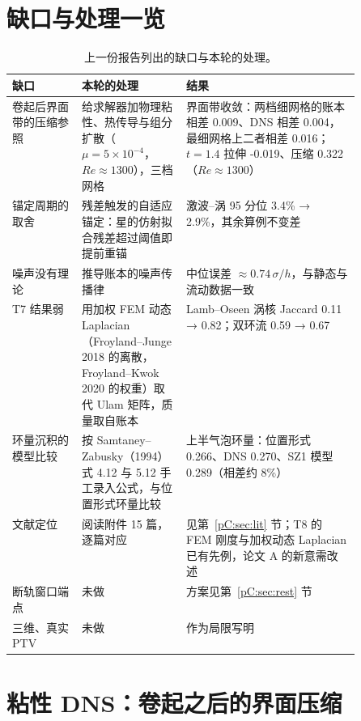 \section{缺口与处理一览}
\begin{table}[!htbp]\centering\small\caption{上一份报告列出的缺口与本轮的处理。}
\begin{tabularx}{\linewidth}{@{}>{\raggedright\arraybackslash}p{0.2\linewidth} >{\raggedright\arraybackslash}p{0.3\linewidth} L@{}}\toprule
缺口 & 本轮的处理 & 结果\\\midrule
卷起后界面带的压缩参照 & 给求解器加物理粘性、热传导与组分扩散（$\mu=5\times10^{-4}$，$Re\approx1300$），三档网格 & 界面带收敛：两档细网格的账本相差 0.009、DNS 相差 0.004，最细网格上二者相差 0.016；$t=1.4$ 拉伸 -0.019、压缩 0.322（$Re\approx1300$）\\
锚定周期的取舍 & 残差触发的自适应锚定：星的仿射拟合残差超过阈值即提前重锚 & 激波–涡 95 分位 3.4\% → 2.9\%，其余算例不变差\\
噪声没有理论 & 推导账本的噪声传播律 & 中位误差 $\approx0.74\,\sigma/h$，与静态与流动数据一致\\
T7 结果弱 & 用加权 FEM 动态 Laplacian（Froyland–Junge 2018 的离散，Froyland–Kwok 2020 的权重）取代 Ulam 矩阵，质量取自账本 & Lamb–Oseen 涡核 Jaccard 0.11 → 0.82；双环流 0.59 → 0.67\\
环量沉积的模型比较 & 按 Samtaney–Zabusky（1994）式 4.12 与 5.12 手工录入公式，与位置形式环量比较 & 上半气泡环量：位置形式 0.266、DNS 0.270、SZ1 模型 0.289（相差约 8\%）\\
文献定位 & 阅读附件 15 篇，逐篇对应 & 见第~\ref{pC:sec:lit} 节；T8 的 FEM 刚度与加权动态 Laplacian 已有先例，论文 A 的新意需改述\\
断轨窗口端点 & 未做 & 方案见第~\ref{pC:sec:rest} 节\\
三维、真实 PTV & 未做 & 作为局限写明\\\bottomrule
\end{tabularx}\end{table}
\section{粘性 DNS：卷起之后的界面压缩}\label{pC:sec:visc}
